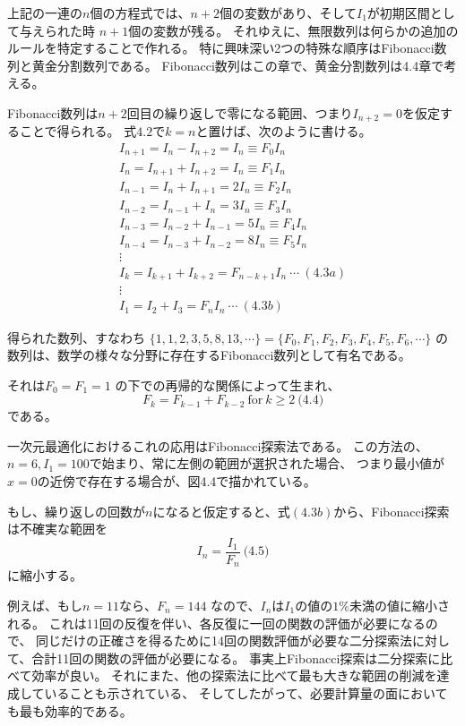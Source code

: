 上記の一連の$n$個の方程式では、$n +
2$個の変数があり、そして$I_1$が初期区間として与えられた時 $n +
1$個の変数が残る。
それゆえに、無限数列は何らかの追加のルールを特定することで作れる。
特に興味深い2つの特殊な順序はFibonacci数列と黄金分割数列である。
Fibonacci数列はこの章で、黄金分割数列は4.4章で考える。

Fibonacci数列は$n+2$回目の繰り返しで零になる範囲、つまり$I_{n+2} =
0$を仮定することで得られる。 式$4.2$で$k =
n$と置けば、次のように書ける。 $$ \begin{array}{c}
I_{n+1} = I_n - I_{n+2} = I_n \equiv F_0I_n
\\ I_{n} = I_{n+1} + I_{n+2} =
I_n \equiv F_1I_n \\
I_{n-1} = I_n + I_{n+1} = 2I_n \equiv F_2I_n
\\ I_{n-2} = I_{n-1} + I_{n} =
3I_n \equiv F_3I_n \\
I_{n-3} = I_{n-2} + I_{n-1} = 5I_n \equiv
F_4I_n \\ I_{n-4} = I_{n-3} +
I_{n-2} = 8I_n \equiv F_5I_n
\\ \vdots
\\ I_k = I_{k+1} + I_{k+2} = F_{n
- k + 1}I_n \ \cdots\
(4.3a) \\ \vdots
\\ I_1 = I_2 + I_3 = F_nI_n
\ \cdots\ (4.3b)
\end{array} $$

得られた数列、すなわち $\lbrace1, 1, 2, 3, 5, 8, 13,
\cdots \rbrace = \lbrace
F_0, F_1, F_2, F_3, F_4, F_5, F_6, \cdots
\rbrace $
の数列は、数学の様々な分野に存在するFibonacci数列として有名である。

それは$F_0 = F_1 = 1 $ の下での再帰的な関係によって生まれ、 $$ F_k
= F_{k-1} + F_{k-2} \ \text{for} \ k
\geq 2 \ \text{(4.4)} $$ である。

一次元最適化におけるこれの応用はFibonacci探索法である。 この方法の、$n
= 6, I_1 = 100 $で始まり、常に左側の範囲が選択された場合、
つまり最小値が$x = 0$の近傍で存在する場合が、図4.4で描かれている。

もし、繰り返しの回数が$n$になると仮定すると、式$(4.3b)$から、Fibonacci探索は不確実な範囲を
$$I_n = \frac{I_1}{F_n}
\ \text{(4.5)}$$ に縮小する。

例えば、もし$n = 11$なら、$F_n = 144$
なので、$I_n$は$I_1$の値の$1\%$未満の値に縮小される。
これは11回の反復を伴い、各反復に一回の関数の評価が必要になるので、
同じだけの正確さを得るために14回の関数評価が必要な二分探索法に対して、合計11回の関数の評価が必要になる。
事実上Fibonacci探索は二分探索に比べて効率が良い。
それにまた、他の探索法に比べて最も大きな範囲の削減を達成していることも示されている、
そしてしたがって、必要計算量の面においても最も効率的である。

